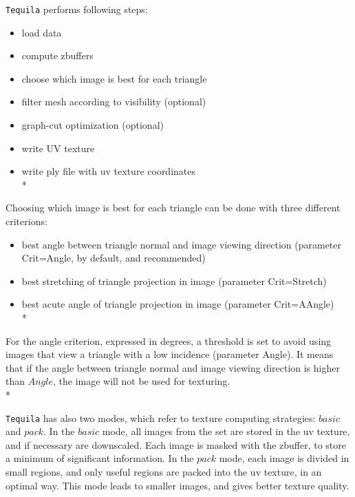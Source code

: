 {\tt Tequila} performs following steps:

\begin{itemize}
    \item load data
    \item compute zbuffers
    \item choose which image is best for each triangle
    \item filter mesh according to visibility (optional)
    \item graph-cut optimization (optional)
    \item write UV texture
    \item write ply file with uv texture coordinates\\*
\end{itemize}

Choosing which image is best for each triangle can be done with three different criterions:
\begin{itemize}
\item   best angle between triangle normal and image viewing direction (parameter Crit=Angle, by default, and recommended)
\item   best stretching of triangle projection in image (parameter Crit=Stretch)
\item   best acute angle of triangle projection in image (parameter Crit=AAngle)\\*
\end{itemize}

For the angle criterion, expressed in degrees, a threshold is set to avoid using images that view a triangle with a low incidence (parameter Angle).
It means that if the angle between triangle normal and image viewing direction is higher than $Angle$, the image will not be used for texturing.\\*

{\tt Tequila} has also two modes, which refer to texture computing strategies: $basic$ and $pack$. In the $basic$ mode, all images from the set are stored in the uv texture, and if necessary are downscaled. Each image is masked with the zbuffer, to store a minimum of significant information.
In the $pack$ mode, each image is divided in small regions, and only useful regions are packed into the uv texture, in an optimal way. This mode leads to smaller images, and gives better texture quality.

